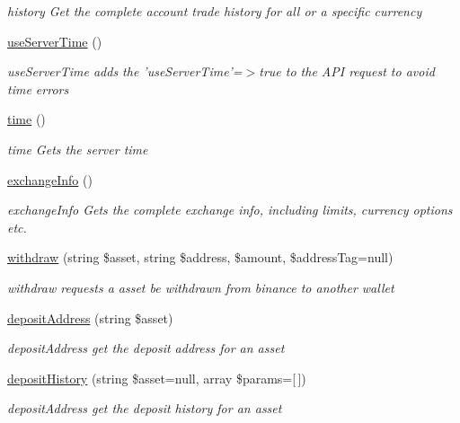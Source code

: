 \begin{DoxyCompactItemize}
\begin{DoxyCompactList}\small\item\em history Get the complete account trade history for all or a specific currency \end{DoxyCompactList}\item 
\hyperlink{classBinance_1_1API_abcc2a5c9ca76dd659db43aec7a0a9a5f}{use\-Server\-Time} ()
\begin{DoxyCompactList}\small\item\em use\-Server\-Time adds the 'use\-Server\-Time'=$>$true to the A\-P\-I request to avoid time errors \end{DoxyCompactList}\item 
\hyperlink{classBinance_1_1API_afd72d19a5504b1a0a694ca9a8af1047b}{time} ()
\begin{DoxyCompactList}\small\item\em time Gets the server time \end{DoxyCompactList}\item 
\hyperlink{classBinance_1_1API_a944f676d29829384ea8eca179fe9ca5a}{exchange\-Info} ()
\begin{DoxyCompactList}\small\item\em exchange\-Info Gets the complete exchange info, including limits, currency options etc. \end{DoxyCompactList}\item 
\hyperlink{classBinance_1_1API_ab69047e208ca2a148f97120d518ecd3e}{withdraw} (string \$asset, string \$address, \$amount, \$address\-Tag=null)
\begin{DoxyCompactList}\small\item\em withdraw requests a asset be withdrawn from binance to another wallet \end{DoxyCompactList}\item 
\hyperlink{classBinance_1_1API_a40614aa2f9799c1197919812b37e6061}{deposit\-Address} (string \$asset)
\begin{DoxyCompactList}\small\item\em deposit\-Address get the deposit address for an asset \end{DoxyCompactList}\item 
\hyperlink{classBinance_1_1API_ac1e40c1bef7a768365d1e123d2324d5d}{deposit\-History} (string \$asset=null, array \$params=\mbox{[}$\,$\mbox{]})
\begin{DoxyCompactList}\small\item\em deposit\-Address get the deposit history for an asset \end{DoxyCompactList}\item 

\end{DoxyCompactItemize}
